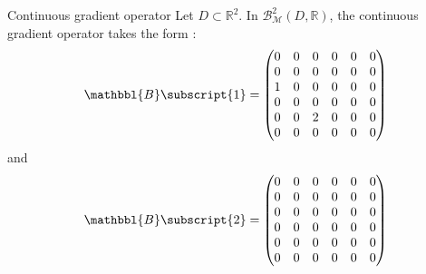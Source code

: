 \begin{exemplebox}{Continuous gradient operator}
            Let $D \subset \mathbb{R}^2$. In $\mathcal{B}_{\mathcal{M}}^2(D, \mathbb{R})$, the continuous gradient operator takes the form :
            \begin{equation}
                \begin{aligned}
                    \mathbbl{B}\subscript{1} =
                    \begin{pmatrix}
                        \begin{aligned}
                            0 && 0 && 0 && 0 && 0 && 0
                            \\
                            0 && 0 && 0 && 0 && 0 && 0
                            \\
                            1 && 0 && 0 && 0 && 0 && 0
                            \\
                            0 && 0 && 0 && 0 && 0 && 0
                            \\
                            0 && 0 && 2 && 0 && 0 && 0
                            \\
                            0 && 0 && 0 && 0 && 0 && 0
                        \end{aligned}
                    \end{pmatrix}
                \end{aligned}
            \end{equation}
            and
            \begin{equation}
                \begin{aligned}
                    \mathbbl{B}\subscript{2} =
                    \begin{pmatrix}
                        \begin{aligned}
                            0 && 0 && 0 && 0 && 0 && 0
                            \\
                            0 && 0 && 0 && 0 && 0 && 0
                            \\
                            0 && 0 && 0 && 0 && 0 && 0
                            \\
                            0 && 0 && 0 && 0 && 0 && 0
                            \\
                            0 && 0 && 0 && 0 && 0 && 0
                            \\
                            0 && 0 && 0 && 0 && 0 && 0
                        \end{aligned}
                    \end{pmatrix}
                \end{aligned}
            \end{equation}
        \end{exemplebox}

